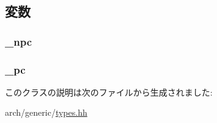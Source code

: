 \subsection{変数}
\hypertarget{classGenericISA_1_1PCStateBase_a1af7c66d6986c1ca86accf8304f958cf}{
\subsubsection[{\_\-npc}]{ {\bf \_\-npc}}}
\label{classGenericISA_1_1PCStateBase_a1af7c66d6986c1ca86accf8304f958cf}
\hypertarget{classGenericISA_1_1PCStateBase_aca8c2d126b6fd936bb5c48007248beed}{
\subsubsection[{\_\-pc}]{ {\bf \_\-pc}}}
\label{classGenericISA_1_1PCStateBase_aca8c2d126b6fd936bb5c48007248beed}


このクラスの説明は次のファイルから生成されました:\begin{DoxyCompactItemize}
\item 
arch/generic/\hyperlink{arch_2generic_2types_8hh}{types.hh}\end{DoxyCompactItemize}
